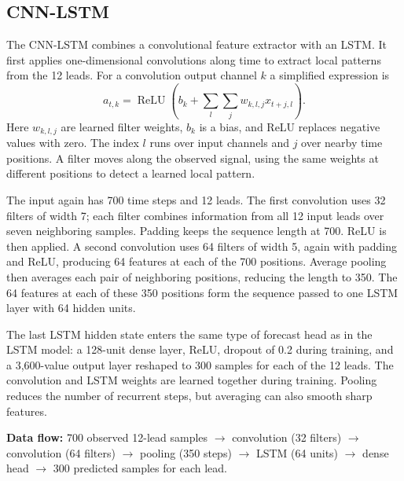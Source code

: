 \documentclass[11pt,a4paper]{article}
\begin{document}
\subsection{CNN-LSTM}
The CNN-LSTM combines a convolutional feature extractor with an LSTM. It first applies one-dimensional convolutions along time to extract local patterns from the 12 leads. For a convolution output channel $k$ a simplified expression is
\begin{equation}
 a_{t,k}=\operatorname{ReLU}\!\left(b_k+\sum_l\sum_j w_{k,l,j}x_{t+j,l}\right).
\end{equation}
Here $w_{k,l,j}$ are learned filter weights, $b_k$ is a bias, and ReLU replaces negative values with zero. The index $l$ runs over input channels and $j$ over nearby time positions. A filter moves along the observed signal, using the same weights at different positions to detect a learned local pattern.

The input again has 700 time steps and 12 leads. The first convolution uses 32 filters of width 7; each filter combines information from all 12 input leads over seven neighboring samples. Padding keeps the sequence length at 700. ReLU is then applied. A second convolution uses 64 filters of width 5, again with padding and ReLU, producing 64 features at each of the 700 positions. Average pooling then averages each pair of neighboring positions, reducing the length to 350. The 64 features at each of these 350 positions form the sequence passed to one LSTM layer with 64 hidden units.

The last LSTM hidden state enters the same type of forecast head as in the LSTM model: a 128-unit dense layer, ReLU, dropout of 0.2 during training, and a 3,600-value output layer reshaped to 300 samples for each of the 12 leads. The convolution and LSTM weights are learned together during training. Pooling reduces the number of recurrent steps, but averaging can also smooth sharp features.

\textbf{Data flow:} 700 observed 12-lead samples $\rightarrow$ convolution (32 filters) $\rightarrow$ convolution (64 filters) $\rightarrow$ pooling (350 steps) $\rightarrow$ LSTM (64 units) $\rightarrow$ dense head $\rightarrow$ 300 predicted samples for each lead.
\end{document}
